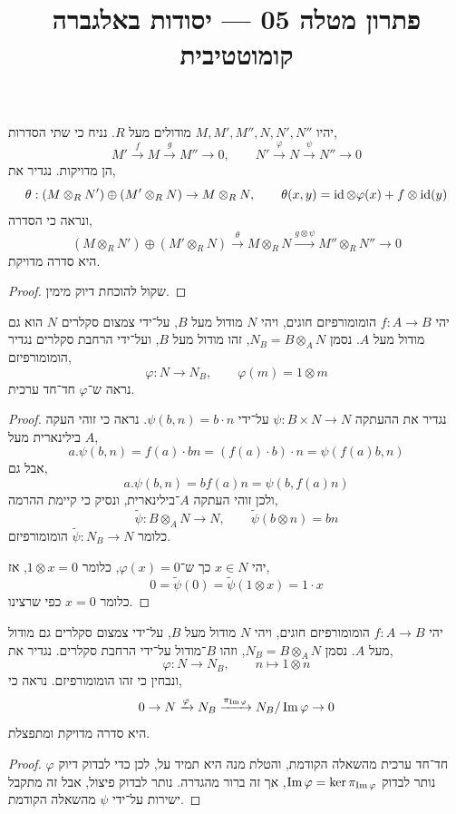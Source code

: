 
\title{פתרון מטלה 05 --- יסודות באלגברה קומוטטיבית}

\DeclareMathOperator{\Ann}{Ann}


\maketitle
\maketitleprint[red]

\question[2]{}
יהיו $M, M', M'', N, N', N''$ מודולים מעל $R$.
נניח כי שתי הסדרות,
\[
	M'
	\xrightarrow{f} M
	\xrightarrow{g} M''
	\to 0,
	\qquad
	N'
	\xrightarrow{\varphi} N
	\xrightarrow{\psi} N''
	\to 0
\]
הן מדויקות.
נגדיר את,
\[
	\theta : (M \otimes_R N') \oplus (M' \otimes_R N) \to M \otimes_R N,
	\qquad
	\theta(x, y)
	= \operatorname{id} \otimes \varphi(x) + f \otimes \operatorname{id}(y)
\]
ונראה כי הסדרה,
\[
	(M \otimes_R N') \oplus (M' \otimes_R N)
	\xrightarrow{\theta} M \otimes_R N
	\xrightarrow{g \otimes \psi} M'' \otimes_R N''
	\to 0
\]
היא סדרה מדויקת.
\begin{proof}
	שקול להוכחת דיוק מימין.
\end{proof}

\question{}
יהי $f : A \to B$ הומומורפיזם חוגים, ויהי $N$ מודול מעל $B$, על־ידי צמצום סקלרים $N$ הוא גם מודול מעל $A$.
נסמן $N_B = B \otimes_A N$, זהו מודול מעל $B$, ועל־ידי הרחבת סקלרים נגדיר הומומורפיזם,
\[
	\varphi : N \to N_B,
	\qquad
	\varphi(m) = 1 \otimes m
\]
נראה ש־$\varphi$ חד־חד ערכית.
\begin{proof}
	נגדיר את ההעתקה $\psi : B \times N \to N$ על־ידי $\psi(b, n) = b \cdot n$.
	נראה כי זוהי העקה בילינארית מעל $A$,
	\[
		a . \psi(b, n)
		= f(a) \cdot b n
		= (f(a) \cdot b) \cdot n
		= \psi(f(a) b, n)
	\]
	אבל גם,
	\[
		a . \psi(b, n)
		= b f(a) n
		= \psi(b, f(a) n)
	\]
	ולכן זוהי העתקה $A$־בילינארית, ונסיק כי קיימת ההרמה,
	\[
		\tilde{\psi} : B \otimes_A N \to N,
		\qquad
		\tilde{\psi}(b \otimes n)
		= b n
	\]
	כלומר $\tilde{\psi} : N_B \to N$ הומומורפיזם.

	יהי $x \in N$ כך ש־$\varphi(x) = 0$, כלומר $1 \otimes x = 0$, אז,
	\[
		0
		= \tilde{\psi}(0)
		= \tilde{\psi}(1 \otimes x)
		= 1 \cdot x
	\]
	כלומר $x = 0$ כפי שרצינו.
\end{proof}

\question{}
יהי $f : A \to B$ הומומורפיזם חוגים, ויהי $N$ מודול מעל $B$, על־ידי צמצום סקלרים גם מודול מעל $A$.
נסמן $N_B = B \otimes_A N$, וזהו $B$־מודול על־ידי הרחבת סקלרים.
נגדיר את,
\[
	\varphi : N \to N_B,
	\qquad
	n \mapsto 1 \otimes n
\]
ונבחין כי זהו הומומורפיזם.
נראה כי,
\[
	0
	\to N
	\xrightarrow{\varphi} N_B
	\xrightarrow{\pi_{\operatorname{Im} \varphi}} N_B / \operatorname{Im} \varphi
	\to 0
\]
היא סדרה מדויקת ומתפצלת.
\begin{proof}
	$\varphi$ חד־חד ערכית מהשאלה הקודמת, והטלת מנה היא תמיד על, לכן כדי לבדוק דיוק נותר לבדוק $\operatorname{Im} \varphi = \ker \pi_{\operatorname{Im} \varphi}$, אך זה ברור מהגדרה.
	נותר לבדוק פיצול, אבל זה מתקבל ישירות על־ידי $\psi$ מהשאלה הקודמת.
\end{proof}

